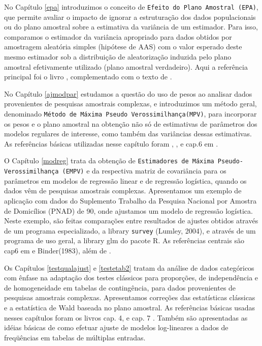 \documentclass[]{book}
\numberwithin{example}{chapter}
\numberwithin{remark}{chapter}
\numberwithin{definition}{chapter}
\begin{document}
No Capítulo \ref{epa} introduzimos o conceito de
\texttt{Efeito\ do\ Plano\ Amostral\ (EPA)}, que permite avaliar o
impacto de ignorar a estruturação dos dados populacionais ou do plano
amostral sobre a estimativa da variância de um estimador. Para isso,
comparamos o estimador da variância apropriado para dados obtidos por
amostragem aleatória simples (hipótese de AAS) com o valor esperado
deste mesmo estimador sob a distribuição de aleatorização induzida pelo
plano amostral efetivamente utilizado (plano amostral verdadeiro). Aqui
a referência principal foi o livro \citep{SHS89}, complementado com o
texto de \citep{lethonen}.

No Capítulo \ref{ajmodpar} estudamos a questão do uso de pesos ao
analisar dados provenientes de pesquisas amostrais complexas, e
introduzimos um método geral, denominado
\texttt{Método\ de\ Máxima\ Pseudo\ Verossimilhança(MPV)}, para
incorporar os pesos e o plano amostral na obtenção não só de estimativas
de parâmetros dos modelos regulares de interesse, como também das
variâncias dessas estimativas. As referências básicas utilizadas nesse
capítulo foram \citep{SHS89}, \citep{Pfeff}, \citep{binder83} e cap.6 em
\citep{Silva}.

O Capítulo \ref{modreg} trata da obtenção de
\texttt{Estimadores\ de\ Máxima\ Pseudo-Verossimilhança\ (EMPV)} e da
respectiva matriz de covariância para os parâmetros em modelos de
regressão linear e de regressão logística, quando os dados vêm de
pesquisas amostrais complexas. Apresentamos um exemplo de aplicação com
dados do Suplemento Trabalho da Pesquisa Nacional por Amostra de
Domicílios (PNAD) de 90, onde ajustamos um modelo de regressão
logística. Neste exemplo, são feitas comparações entre resultados de
ajustes obtidos através de um programa especializado, a library
\texttt{survey} (Lumley, 2004), e através de um programa de uso geral, a
library glm do pacote R. As referências centrais são cap6 em
\citep{Silva} e Binder(1983), além de \citep{Pessoa}.

Os Capítulos \ref{testqualajust} e \ref{testetab2} tratam da análise de
dados categóricos com ênfase na adaptação dos testes clássicos para
proporções, de independência e de homogeneidade em tabelas de
contingência, para dados provenientes de pesquisas amostrais complexas.
Apresentamos correções das estatísticas clássicas e a estatística de
Wald baseada no plano amostral. As referências básicas usadas nesses
capítulos foram os livros cap. 4, \citep{SHS89} e cap. 7
\citep{lethonen}. Também são apresentadas as idéias básicas de como
efetuar ajuste de modelos log-lineares a dados de freqüências em tabelas
de múltiplas entradas.
\end{document}
